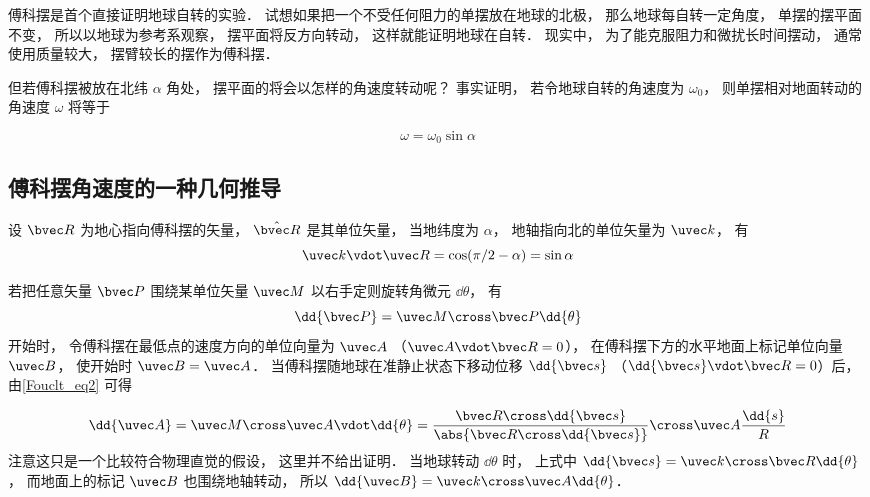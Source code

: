 \usepackage[utf8]{inputenc}
\usepackage{xltxtra}
\usepackage{graphics}
\usepackage{amsmath}
\usepackage{amssymb}

\renewcommand{\i}{\vec i}
\renewcommand{\j}{\vec j}
\renewcommand{\k}{\vec k}


傅科摆是首个直接证明地球自转的实验． 试想如果把一个不受任何阻力的单摆放在地球的北极， 那么地球每自转一定角度， 单摆的摆平面不变， 所以以地球为参考系观察， 摆平面将反方向转动， 这样就能证明地球在自转． 现实中， 为了能克服阻力和微扰长时间摆动， 通常使用质量较大， 摆臂较长的摆作为傅科摆．

但若傅科摆被放在北纬 $\alpha$ 角处， 摆平面的将会以怎样的角速度转动呢？ 事实证明， 若令地球自转的角速度为 $\omega_0$， 则单摆相对地面转动的角速度 $\omega$ 将等于

\begin{equation}
\omega = \omega_0 \sin\alpha
\end{equation}

\subsection{傅科摆角速度的一种几何推导}
设 $\bvec R$ 为地心指向傅科摆的矢量， $\hat {\bvec R}$ 是其单位矢量， 当地纬度为 $\alpha$， 地轴指向北的单位矢量为 $\uvec k$， 有
\begin{equation}
\uvec k\vdot \uvec R = \cos(\pi/2 - \alpha) = \sin\alpha
\end{equation}

若把任意矢量 $\bvec P$ 围绕某单位矢量 $\uvec M$ 以右手定则旋转角微元 $\dd{\theta}$， 有
\begin{equation}\label{Fouclt_eq2}
\dd{\bvec P} = \uvec M \cross \bvec P \dd{\theta}
\end{equation}
开始时， 令傅科摆在最低点的速度方向的单位向量为 $\uvec A$ （$\uvec A\vdot \bvec R = 0$）， 在傅科摆下方的水平地面上标记单位向量 $\uvec B$， 使开始时 $\uvec B = \uvec A$． 当傅科摆随地球在准静止状态下移动位移 $\dd{\bvec s}$ （$\dd{\bvec s} \vdot\bvec R = 0$）后， 由\autoref{Fouclt_eq2} 可得

\begin{equation}
\dd{\uvec A} = \uvec M\cross \uvec A\vdot \dd{\theta} = 
\frac{\bvec R\cross \dd{\bvec s}}{\abs{\bvec R\cross \dd{\bvec s}}} \cross \uvec A \frac{\dd{s}}{R}
\end{equation}
注意这只是一个比较符合物理直觉的假设， 这里并不给出证明． 当地球转动 $\dd{\theta}$ 时， 上式中 $\dd{\bvec s} = \uvec k \cross \bvec R \dd{\theta}$， 而地面上的标记 $\uvec B$ 也围绕地轴转动， 所以 $\dd{\uvec B} = \uvec k \cross \uvec A \dd{\theta}$．

